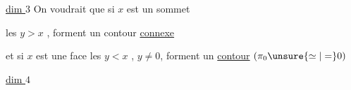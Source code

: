 \uline{dim $3$} \quad On voudrait que si $x$ est un sommet


les $y>x$ ,  forment un
contour \uline{connexe}

et si $x$ est une face
les $y<x$ , $y\ne0$,
forment un \uline{contour}
$(\pi_0\unsure{\simeq|=}0)$

\uline{dim $4$}
